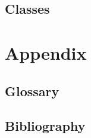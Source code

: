 \documentclass[10pt,twoside,twocolumn,openany,nomultitoc]{book}
\begin{document}
            
\section{Classes}

\chapter{Appendix}
\section{Glossary}
\printglossaries


\section{Bibliography}
\begingroup
\let\clearpage\relax

    \nocite{*}

    \endgroup




\end{document}
